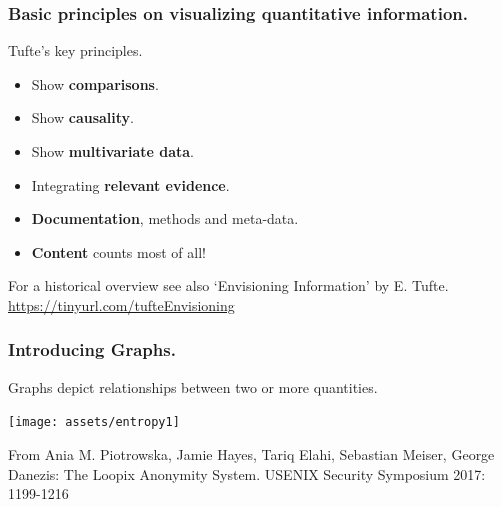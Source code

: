 \documentclass{beamer} %
\newcommand\emc[1]{\textcolor{brightblue}{\textbf{#1}}}
\begin{document}
\begin{frame}

\frametitle{Basic principles on visualizing quantitative information.}

Tufte's key principles.
\begin{itemize}
\item Show \emc{comparisons}.
\item Show \emc{causality}.
\item Show \emc{multivariate data}.
\item Integrating \emc{relevant evidence}.
\item \emc{Documentation}, methods and meta-data.
\item \emc{Content} counts most of all! 
\end{itemize}

\vspace{3mm}
For a historical overview see also `Envisioning Information' by E. Tufte.\\ 
\url{https://tinyurl.com/tufteEnvisioning}

\end{frame}

\begin{frame}

\frametitle{Introducing Graphs.}

Graphs depict relationships between two or more quantities.
\begin{center}
\texttt{[image: assets/entropy1]}
\end{center}

\tiny From Ania M. Piotrowska, Jamie Hayes, Tariq Elahi, Sebastian Meiser, George Danezis:
The Loopix Anonymity System. USENIX Security Symposium 2017: 1199-1216

\end{frame}
\end{document}
